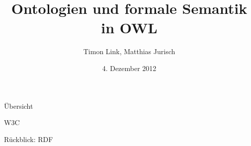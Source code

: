 \documentclass{beamer}
\title[OWL]{Ontologien und formale Semantik in OWL}
\author{Timon Link, Matthias Jurisch}
\date{4. Dezember 2012}
\begin{document}
\begin{frame}
\titlepage
\end{frame}

\begin{frame}{Übersicht}
\end{frame}

\begin{frame}{W3C}
\end{frame}

\begin{frame}{Rückblick: RDF}
\end{frame}




\end{document}
